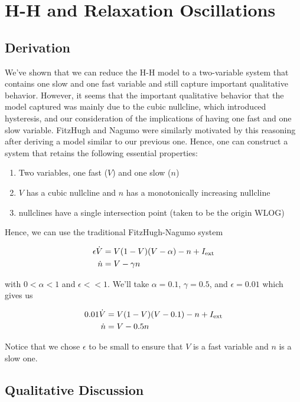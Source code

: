 \documentclass{article}
\begin{document}
\section{H-H and Relaxation Oscillations}

\subsection{Derivation}

We've shown that we can reduce the H-H model to a two-variable system that contains one slow and one fast variable and still capture important qualitative behavior. However, it seems that the important qualitative behavior that the model captured was mainly due to the cubic nullcline, which introduced hysteresis, and our consideration of the implications of having one fast and one slow variable. FitzHugh and Nagumo were similarly motivated by this reasoning after deriving a model similar to our previous one\cite{keener}. Hence, one can construct a system that retains the following essential properties:

\begin{enumerate}
    \item Two variables, one fast ($V$) and one slow ($n$)
    \item $V$ has a cubic nullcline and $n$ has a monotonically increasing nullcline
    \item nullclines have a single intersection point (taken to be the origin WLOG)
\end{enumerate}

Hence, we can use the traditional FitzHugh-Nagumo system

\begin{align*}
    \epsilon {\dot  {V} }&= V(1-V)(V-\alpha) -n+I_{{{\rm {ext}}}} \\
     {\dot  {n}}&=V-\gamma n
\end{align*}

with $0<\alpha<1$ and $\epsilon << 1$. We'll take $\alpha = 0.1$, $\gamma = 0.5$, and $\epsilon = 0.01$ which gives us

\begin{align*}
    0.01 {\dot  {V} }&= V(1-V)(V-0.1) -n+I_{{{\rm {ext}}}} \\
     {\dot  {n}}&=V-0.5 n
\end{align*}

Notice that we chose $\epsilon$ to be small to ensure that $V$ is a fast variable and $n$ is a slow one. 

\subsection{Qualitative Discussion}
\end{document}
